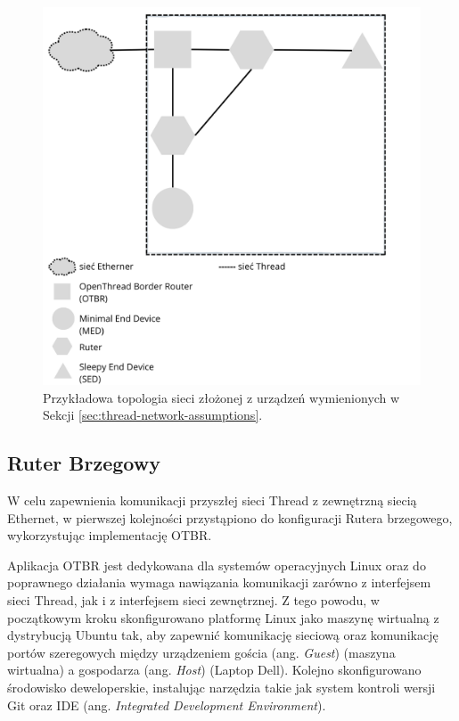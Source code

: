         \begin{figure}[H]
            \centering
            \includegraphics[width=0.8\linewidth]{graphics/thread-topology.png}
            \caption{Przykładowa topologia sieci złożonej z urządzeń wymienionych w Sekcji \ref{sec:thread-network-assumptions}.}
            \label{fig:thread-topology}
        \end{figure}

    \subsection{Ruter Brzegowy}
    \label{subsec:otbr-implementation}

        W celu zapewnienia komunikacji przyszłej sieci Thread z zewnętrzną siecią Ethernet, w pierwszej kolejności przystąpiono do konfiguracji Rutera brzegowego, wykorzystując implementację OTBR. 
        
        Aplikacja OTBR jest dedykowana dla systemów operacyjnych Linux oraz do poprawnego działania wymaga nawiązania komunikacji zarówno z interfejsem sieci Thread, jak i z interfejsem sieci zewnętrznej. Z tego powodu, w początkowym kroku skonfigurowano platformę Linux jako maszynę wirtualną z dystrybucją Ubuntu tak, aby zapewnić komunikację sieciową oraz komunikację portów szeregowych między urządzeniem gościa (ang. \textit{Guest}) (maszyna wirtualna) a gospodarza (ang. \textit{Host}) (Laptop Dell). Kolejno skonfigurowano środowisko deweloperskie, instalując narzędzia takie jak system kontroli wersji Git oraz IDE (ang. \textit{Integrated Development Environment}). 

